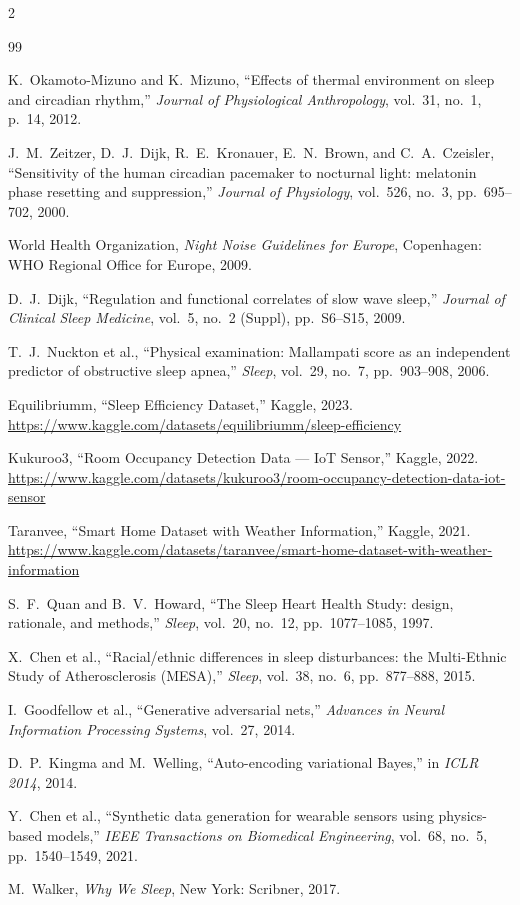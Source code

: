 \documentclass[11pt,a4paper]{article}
\begin{document}
\begin{multicols}{2}
\begin{thebibliography}{99}

K.~Okamoto-Mizuno and K.~Mizuno,
``Effects of thermal environment on sleep and circadian rhythm,''
\textit{Journal of Physiological Anthropology}, vol.~31, no.~1, p.~14, 2012.

J.~M.~Zeitzer, D.~J.~Dijk, R.~E.~Kronauer, E.~N.~Brown, and C.~A.~Czeisler,
``Sensitivity of the human circadian pacemaker to nocturnal light: melatonin phase resetting and suppression,''
\textit{Journal of Physiology}, vol.~526, no.~3, pp.~695--702, 2000.

World Health Organization,
\textit{Night Noise Guidelines for Europe},
Copenhagen: WHO Regional Office for Europe, 2009.

D.~J.~Dijk,
``Regulation and functional correlates of slow wave sleep,''
\textit{Journal of Clinical Sleep Medicine}, vol.~5, no.~2 (Suppl), pp.~S6--S15, 2009.

T.~J.~Nuckton et al.,
``Physical examination: Mallampati score as an independent predictor of obstructive sleep apnea,''
\textit{Sleep}, vol.~29, no.~7, pp.~903--908, 2006.

Equilibriumm,
``Sleep Efficiency Dataset,''
Kaggle, 2023.
\url{https://www.kaggle.com/datasets/equilibriumm/sleep-efficiency}

Kukuroo3,
``Room Occupancy Detection Data — IoT Sensor,''
Kaggle, 2022.
\url{https://www.kaggle.com/datasets/kukuroo3/room-occupancy-detection-data-iot-sensor}

Taranvee,
``Smart Home Dataset with Weather Information,''
Kaggle, 2021.
\url{https://www.kaggle.com/datasets/taranvee/smart-home-dataset-with-weather-information}

S.~F.~Quan and B.~V.~Howard,
``The Sleep Heart Health Study: design, rationale, and methods,''
\textit{Sleep}, vol.~20, no.~12, pp.~1077--1085, 1997.

X.~Chen et al.,
``Racial/ethnic differences in sleep disturbances: the Multi-Ethnic Study of Atherosclerosis (MESA),''
\textit{Sleep}, vol.~38, no.~6, pp.~877--888, 2015.

I.~Goodfellow et al.,
``Generative adversarial nets,''
\textit{Advances in Neural Information Processing Systems}, vol.~27, 2014.

D.~P.~Kingma and M.~Welling,
``Auto-encoding variational Bayes,''
in \textit{ICLR 2014}, 2014.

Y.~Chen et al.,
``Synthetic data generation for wearable sensors using physics-based models,''
\textit{IEEE Transactions on Biomedical Engineering}, vol.~68, no.~5, pp.~1540--1549, 2021.

M.~Walker,
\textit{Why We Sleep},
New York: Scribner, 2017.

\end{thebibliography}

\end{multicols}
\end{document}
